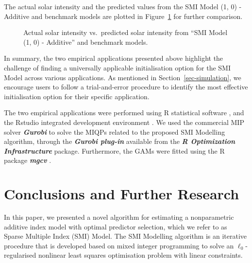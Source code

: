 \documentclass[
  11pt,
  a4paper,
]{article}
\begin{document}
The actual solar intensity and the predicted values from the SMI Model
(1, 0) - Additive and benchmark models are plotted in
Figure~\ref{fig-solarPred} for further comparison.

\begin{figure}


\caption{\label{fig-solarPred}Actual solar intensity vs.~predicted solar
intensity from ``SMI Model (1, 0) - Additive'' and benchmark models.}

\end{figure}%

In summary, the two empirical applications presented above highlight the
challenge of finding a universally applicable initialisation option for
the SMI Model across various applications. As mentioned in
Section~\ref{sec-simulation}, we encourage users to follow a
trial-and-error procedure to identify the most effective initialisation
option for their specific application.

The two empirical applications were performed using R statistical
software \autocite{R2023}, and the Rstudio integrated development
environment \autocite[IDE,][]{Rstudio2024}. We used the commercial MIP
solver \textbf{\emph{Gurobi}} \autocite{gurobi2023} to solve the MIQPs
related to the proposed SMI Modelling algorithm, through the
\textbf{\emph{Gurobi plug-in}}
\autocite[ROI.plugin.gurobi,][]{Schwendinger2023} available from the
\textbf{\emph{R Optimization Infrastructure}}
\autocites[ROI,][]{Hornik2023,Theusl2020} package. Furthermore, the GAMs
were fitted using the R package \textbf{\emph{mgcv}}
\autocite[v1.9.1,][]{Wood2011}.

\section{Conclusions and Further Research}\label{sec-conclusion}

In this paper, we presented a novel algorithm for estimating a
nonparametric additive index model with optimal predictor selection,
which we refer to as Sparse Multiple Index (SMI) Model. The SMI
Modelling algorithm is an iterative procedure that is developed based on
mixed integer programming to solve an \(\ell_{0}\)-regularised nonlinear
least squares optimisation problem with linear constraints.
\end{document}
